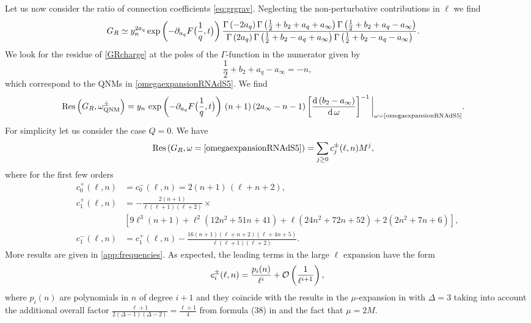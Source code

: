 \documentclass[11pt]{article}
\numberwithin{equation}{section}
\newcommand{\be}{\begin{equation}}
\newcommand{\ee}{\end{equation}}
\newcommand{\ba}{\begin{aligned}}
\newcommand{\ea}{\end{aligned}}
\begin{document}
Let us now consider the ratio of connection coefficients \eqref{eq:grgrav}.
Neglecting the non-perturbative contributions in $\ell$  we find 
\begin{equation}
\begin{aligned}\label{GRcharge}
G_R&\simeq 
y_n^{2a_q}\exp\left(-\partial_{a_{q}}F\big({1\over q},t\big)\right)\frac{\Gamma\left(-2a_{q}\right)\Gamma\left(\frac{1}{2}+b_2+a_{q}+a_{\infty}\right)\Gamma\left(\frac{1}{2}+b_2+a_q-a_{\infty}\right)}{\Gamma\left(2a_{q}\right)\Gamma\left(\frac{1}{2}+b_2-a_{q}+a_{\infty}\right)\Gamma\left(\frac{1}{2}+b_2-a_q-a_{\infty}\right)}.
\end{aligned}
\end{equation}
We look for the residue of \eqref{GRcharge} at the poles of the $\Gamma$-function in the numerator given by
\begin{equation}
\frac{1}{2}+b_2+a_q-a_{\infty}=-n,
\end{equation}
which correspond to the QNMs in \eqref{omegaexpansionRNAdS5}.
We find 
%
\begin{equation}
\begin{aligned}
\mathrm{Res}\left(G_R,\omega_{\text{QNM}}^{\pm}\right)&
=y_n\,\exp\left(-\partial_{a_{q}}F\big({1\over q},t\big)\right)\,(n+1)\,(2a_{\infty}-n-1)\left[\frac{\mathrm{d}\left(b_2-a_{\infty}\right)}{\mathrm{d}\,\omega}\right]^{-1}\bigg|_{\omega=\text{\eqref{omegaexpansionRNAdS5}}}.
\end{aligned}
\end{equation}
%
For simplicity let us consider the case $Q=0$. We have
%
\begin{equation}
\begin{aligned}
\mathrm{Res}\left(G_R,\omega=\text{\eqref{omegaexpansionRNAdS5}}\right)&=\sum_{j\ge 0}c_{j}^\pm(\ell,n)M^j,
\end{aligned}
\end{equation}
where for the first few orders  
\be\ba 
  c_0^+(\ell,n)&=c_0^-(\ell,n)=2(n+1)\,(\ell+n+2),  \\
c_1^+(\ell,n)&=-\frac{2(n+1)}{\ell (\ell+1) (\ell+2)}\times\\
&\left[9 \ell^3 (n+1)+\ell^2 \left(12 n^2+51 n+41\right)+\ell \left(24 n^2+72 n+52\right)+2 \left(2 n^2+7 n+6\right)\right],
\\
c_1^-(\ell,n)&=c_1^+(\ell,n)-\frac{16 (n+1) (\ell+n+2) (\ell+4 n+5)}{\ell (\ell+1) (\ell+2)}.
\ea\ee
More results are given in \autoref{app:frequencies}.
As expected, the leading terms in the large $\ell$ expansion have the form
\be c_i^{\pm}(\ell,n)={p_i(n)\over \ell^i}+\mathcal{O}\left({1\over\ell^{i+1}}\right),\ee
where $p_i(n)$ are polynomials in $n$ of degree $i+1$ and they coincide with the results in the $\mu$-expansion in \cite{Dodelson:2022yvn} with $\Delta=3$ taking into account the additional overall factor $\frac{\ell+1}{2(\Delta-1)(\Delta-2)}=\frac{\ell+1}{4}$ from formula (38) in \cite{Dodelson:2022yvn} and the fact that $\mu=2M$.
\end{document}
